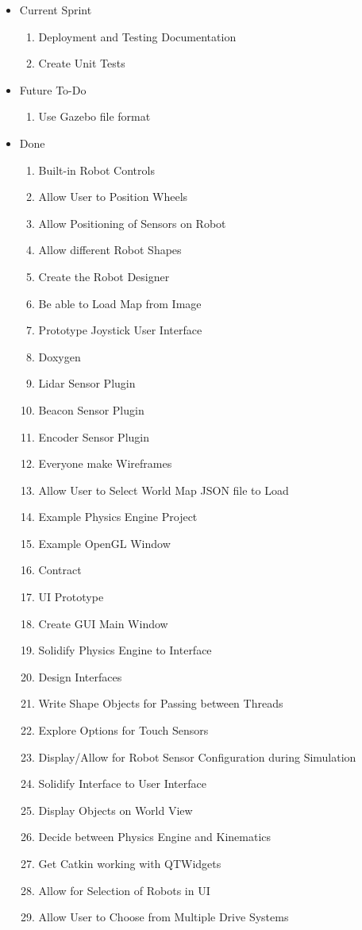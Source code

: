 \begin{itemize}
\item Current Sprint 
\begin{enumerate}
\item Deployment and Testing Documentation
\item Create Unit Tests
\end{enumerate}
\item Future To-Do 
\begin{enumerate}
\item Use Gazebo file format
\end{enumerate}
\item Done
\begin{enumerate}
\item Built-in Robot Controls 
\item Allow User to Position Wheels
\item Allow Positioning of Sensors on Robot
\item Allow different Robot Shapes
\item Create the Robot Designer
\item Be able to Load Map from Image
\item Prototype Joystick User Interface
\item Doxygen
\item Lidar Sensor Plugin
\item Beacon Sensor Plugin
\item Encoder Sensor Plugin
\item Everyone make Wireframes
\item Allow User to Select World Map JSON file to Load
\item Example Physics Engine Project
\item Example OpenGL Window
\item Contract
\item UI Prototype
\item Create GUI Main Window
\item Solidify Physics Engine to Interface
\item Design Interfaces
\item Write Shape Objects for Passing between Threads
\item Explore Options for Touch Sensors
\item Display/Allow for Robot Sensor Configuration during Simulation
\item Solidify Interface to User Interface
\item Display Objects on World View
\item Decide between Physics Engine and Kinematics
\item Get Catkin working with QTWidgets
\item Allow for Selection of Robots in UI
\item Allow User to Choose from Multiple Drive Systems
\end{enumerate}
\end{itemize}

